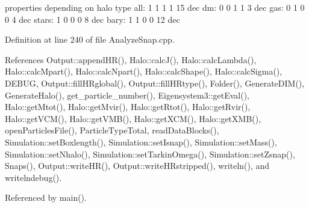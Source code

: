 properties depending on halo type all: 1 1 1 1 15 dec dm: 0 0 1 1 3 dec gas: 0 1 0 0 4 dec stars: 1 0 0 0 8 dec bary: 1 1 0 0 12 dec



Definition at line 240 of file AnalyzeSnap.cpp.



References Output::appendHR(), Halo::calcJ(), Halo::calcLambda(), Halo::calcMpart(), Halo::calcNpart(), Halo::calcShape(), Halo::calcSigma(), DEBUG, Output::fillHRglobal(), Output::fillHRtype(), Folder(), GenerateDIM(), GenerateHalo(), get\_\-particle\_\-number(), Eigensystem3::getEval(), Halo::getMtot(), Halo::getMvir(), Halo::getRtot(), Halo::getRvir(), Halo::getVCM(), Halo::getVMB(), Halo::getXCM(), Halo::getXMB(), openParticlesFile(), ParticleTypeTotal, readDataBlocks(), Simulation::setBoxlength(), Simulation::setIsnap(), Simulation::setMass(), Simulation::setNhalo(), Simulation::setTarkinOmega(), Simulation::setZsnap(), Snaps(), Output::writeHR(), Output::writeHRstripped(), writeln(), and writelndebug().



Referenced by main().

